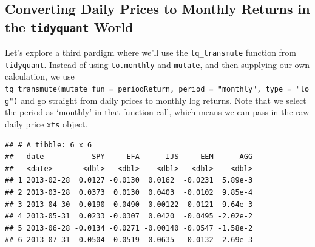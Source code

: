 \documentclass[]{krantz}
\makeatletter
\newenvironment{Shaded}{\begin{snugshade}}{\end{snugshade}}
\newcommand{\KeywordTok}[1]{\textcolor[rgb]{0.13,0.29,0.53}{\textbf{#1}}}
\newcommand{\DataTypeTok}[1]{\textcolor[rgb]{0.13,0.29,0.53}{#1}}
\newcommand{\DecValTok}[1]{\textcolor[rgb]{0.00,0.00,0.81}{#1}}
\newcommand{\StringTok}[1]{\textcolor[rgb]{0.31,0.60,0.02}{#1}}
\newcommand{\OtherTok}[1]{\textcolor[rgb]{0.56,0.35,0.01}{#1}}
\newcommand{\OperatorTok}[1]{\textcolor[rgb]{0.81,0.36,0.00}{\textbf{#1}}}
\newcommand{\NormalTok}[1]{#1}
\newenvironment{kframe}{%
\medskip{}
\setlength{\fboxsep}{.8em}
 \def\at@end@of@kframe{}%
 \ifinner\ifhmode%
  \def\at@end@of@kframe{\end{minipage}}%
  \begin{minipage}{\columnwidth}%
 \fi\fi%
 \def\FrameCommand##1{\hskip\@totalleftmargin \hskip-\fboxsep
 \colorbox{shadecolor}{##1}\hskip-\fboxsep
     \hskip-\linewidth \hskip-\@totalleftmargin \hskip\columnwidth}%
 \MakeFramed {\advance\hsize-\width
   \@totalleftmargin\z@ \linewidth\hsize
   \@setminipage}}%
 {\par\unskip\endMakeFramed%
 \at@end@of@kframe}
\renewenvironment{Shaded}{\begin{kframe}}{\end{kframe}}
\makeatother
\begin{document}
\subsection*{\texorpdfstring{Converting Daily Prices to Monthly Returns
in the \texttt{tidyquant}
World}{Converting Daily Prices to Monthly Returns in the tidyquant World}}\label{converting-daily-prices-to-monthly-returns-in-the-tidyquant-world}

Let's explore a third pardigm where we'll use the \texttt{tq\_transmute}
function from \texttt{tidyquant}. Instead of using \texttt{to.monthly}
and \texttt{mutate}, and then supplying our own calculation, we use
\texttt{tq\_transmute(mutate\_fun\ =\ periodReturn,\ period\ =\ "monthly",\ type\ =\ "log")}
and go straight from daily prices to monthly log returns. Note that we
select the period as `monthly' in that function call, which means we can
pass in the raw daily price \texttt{xts} object.

\begin{Shaded}
\end{Shaded}

\begin{verbatim}
## # A tibble: 6 x 6
##   date           SPY     EFA      IJS     EEM      AGG
##   <date>       <dbl>   <dbl>    <dbl>   <dbl>    <dbl>
## 1 2013-02-28  0.0127 -0.0130  0.0162  -0.0231  5.89e-3
## 2 2013-03-28  0.0373  0.0130  0.0403  -0.0102  9.85e-4
## 3 2013-04-30  0.0190  0.0490  0.00122  0.0121  9.64e-3
## 4 2013-05-31  0.0233 -0.0307  0.0420  -0.0495 -2.02e-2
## 5 2013-06-28 -0.0134 -0.0271 -0.00140 -0.0547 -1.58e-2
## 6 2013-07-31  0.0504  0.0519  0.0635   0.0132  2.69e-3
\end{verbatim}
\end{document}
